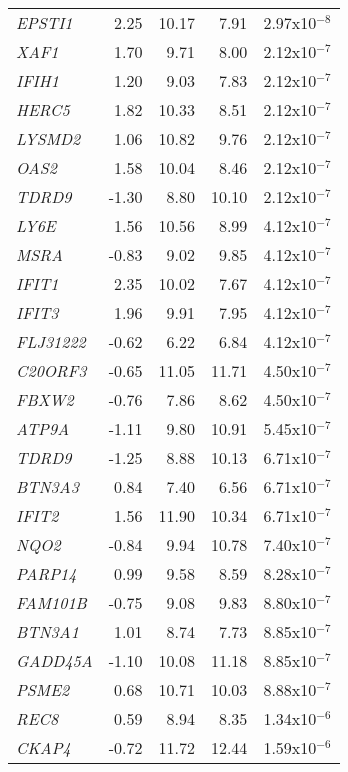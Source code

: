 \begin{center}
\begin{longtable}[p]{ l r r r r }
\textit{EPSTI1} & 2.25  & 10.17 & 7.91  & 2.97x10$^{-8}$ \\
\textit{XAF1} & 1.70  & 9.71  & 8.00  & 2.12x10$^{-7}$ \\
\textit{IFIH1} & 1.20  & 9.03  & 7.83  & 2.12x10$^{-7}$ \\
\textit{HERC5} & 1.82  & 10.33 & 8.51  & 2.12x10$^{-7}$ \\
\textit{LYSMD2} & 1.06  & 10.82 & 9.76  & 2.12x10$^{-7}$ \\
\textit{OAS2} & 1.58  & 10.04 & 8.46  & 2.12x10$^{-7}$ \\
\textit{TDRD9} & -1.30 & 8.80  & 10.10 & 2.12x10$^{-7}$ \\
\textit{LY6E} & 1.56  & 10.56 & 8.99  & 4.12x10$^{-7}$ \\
\textit{MSRA}     & -0.83 & 9.02  & 9.85  & 4.12x10$^{-7}$ \\
\textit{IFIT1}    & 2.35  & 10.02 & 7.67  & 4.12x10$^{-7}$ \\
\textit{IFIT3}    & 1.96  & 9.91  & 7.95  & 4.12x10$^{-7}$ \\
\textit{FLJ31222} & -0.62 & 6.22  & 6.84  & 4.12x10$^{-7}$ \\
\textit{C20ORF3}  & -0.65 & 11.05 & 11.71 & 4.50x10$^{-7}$ \\
\textit{FBXW2}    & -0.76 & 7.86  & 8.62  & 4.50x10$^{-7}$ \\
\textit{ATP9A}    & -1.11 & 9.80  & 10.91 & 5.45x10$^{-7}$ \\
\textit{TDRD9}    & -1.25 & 8.88  & 10.13 & 6.71x10$^{-7}$ \\
\textit{BTN3A3}   & 0.84  & 7.40  & 6.56  & 6.71x10$^{-7}$ \\
\textit{IFIT2}    & 1.56  & 11.90 & 10.34 & 6.71x10$^{-7}$ \\
\textit{NQO2}     & -0.84 & 9.94  & 10.78 & 7.40x10$^{-7}$ \\
\textit{PARP14}   & 0.99  & 9.58  & 8.59  & 8.28x10$^{-7}$ \\
\textit{FAM101B}  & -0.75 & 9.08  & 9.83  & 8.80x10$^{-7}$ \\
\textit{BTN3A1}   & 1.01  & 8.74  & 7.73  & 8.85x10$^{-7}$ \\
\textit{GADD45A}  & -1.10 & 10.08 & 11.18 & 8.85x10$^{-7}$ \\
\textit{PSME2}    & 0.68  & 10.71 & 10.03 & 8.88x10$^{-7}$ \\
\textit{REC8}     & 0.59  & 8.94  & 8.35  & 1.34x10$^{-6}$ \\
\textit{CKAP4}    & -0.72 & 11.72 & 12.44 & 1.59x10$^{-6}$ \\

\end{longtable}
\end{center}
